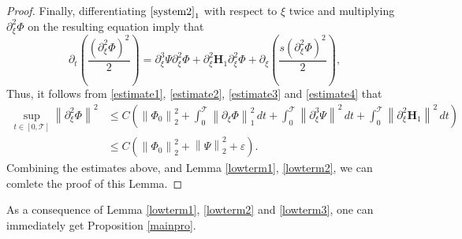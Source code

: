 \documentclass[12pt,reqno]{amsart}
\numberwithin{equation}{section}
\newcommand{\norm}[1]{\left\lVert #1 \right\rVert}
\newcommand{\subeqref}[2]{$ \eqref{#1}_{#2} $}
\def\p{\partial}
\def\T{\mathcal{T}}
\def\supt{\mathop{sup}\limits_{t \in [0,\mathcal{T}]}}
\begin{document}
\begin{proof}
		Finally, differentiating \subeqref{system2}{1} with respect to $\xi$ twice and multiplying $\p^2_{\xi}\Phi$
		on the resulting equation imply that
		\begin{equation}\label{relt7}
			\p_t\left(\frac{(\p^2_{\xi}\Phi)^2}{2}\right)=\p^3_{\xi}\Psi\p^2_{\xi}\Phi+\p^2_{\xi}\mathbf{H}_1\p^2_{\xi}\Phi+\p_{\xi}\left(\frac{s(\p^2_{\xi}\Phi)^2}{2}\right),
		\end{equation}
		Thus, it follows from \eqref{estimate1}, \eqref{estimate2}, \eqref{estimate3} and \eqref{estimate4} that
		\begin{align*}
			\supt\norm{\p^2_{\xi}\Phi}^2 &\leq C\left(\norm{\Phi_0}^2_2+\int_{0}^{\T}\norm{\p_{\xi}\Phi}^2_1\,dt+\int_{0}^{\T}\norm{\p^3_{\xi}\Psi}^2\,dt+\int_{0}^{\T}\norm{\p^2_{\xi}\mathbf{H}_1}^2\,dt\right)\\
			&\leq C(\norm{\Phi_0}^2_2+\norm{\Psi}^2_2+\varepsilon).
		\end{align*}
	Combining the estimates above, and  Lemma \ref{lowterm1}, \ref{lowterm2}, we can comlete the proof of this Lemma.
\end{proof}
As a consequence of Lemma \ref{lowterm1}, \ref{lowterm2} and \ref{lowterm3}, one can immediately get Proposition \ref{mainpro}.
\end{document}
